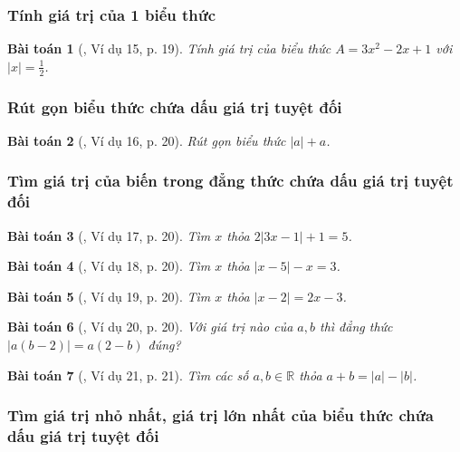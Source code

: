 \documentclass{article}
\numberwithin{equation}{section}
\newtheorem{baitoan}{Bài toán}[section]
\begin{document}
\subsubsection{Tính giá trị của 1 biểu thức}

\begin{baitoan}[\cite{Binh_Toan_7_tap_1}, Ví dụ 15, p. 19]
	Tính giá trị của biểu thức $A = 3x^2 - 2x + 1$ với $|x| = \frac{1}{2}$.
\end{baitoan}

\subsubsection{Rút gọn biểu thức chứa dấu giá trị tuyệt đối}

\begin{baitoan}[\cite{Binh_Toan_7_tap_1}, Ví dụ 16, p. 20]
	Rút gọn biểu thức $|a| + a$.
\end{baitoan}

\subsubsection{Tìm giá trị của biến trong đẳng thức chứa dấu giá trị tuyệt đối}

\begin{baitoan}[\cite{Binh_Toan_7_tap_1}, Ví dụ 17, p. 20]
	Tìm $x$ thỏa $2|3x - 1| + 1 = 5$.
\end{baitoan}

\begin{baitoan}[\cite{Binh_Toan_7_tap_1}, Ví dụ 18, p. 20]
	Tìm $x$ thỏa $|x - 5| - x = 3$.
\end{baitoan}

\begin{baitoan}[\cite{Binh_Toan_7_tap_1}, Ví dụ 19, p. 20]
	Tìm $x$ thỏa $|x - 2| = 2x - 3$.
\end{baitoan}

\begin{baitoan}[\cite{Binh_Toan_7_tap_1}, Ví dụ 20, p. 20]
	Với giá trị nào của $a,b$ thì đẳng thức $|a(b - 2)| = a(2 - b)$ đúng?
\end{baitoan}

\begin{baitoan}[\cite{Binh_Toan_7_tap_1}, Ví dụ 21, p. 21]
	Tìm các số $a,b\in\mathbb{R}$ thỏa $a + b = |a| - |b|$.
\end{baitoan}

\subsubsection{Tìm giá trị nhỏ nhất, giá trị lớn nhất của biểu thức chứa dấu giá trị tuyệt đối}
\end{document}
